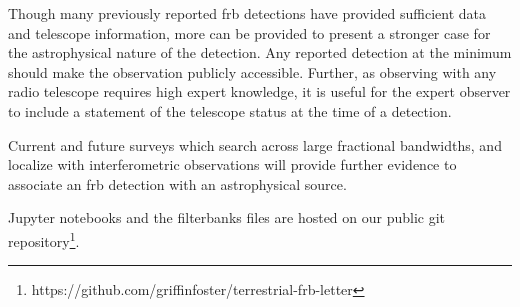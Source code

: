 \documentclass[a4paper,fleqn,usenatbib]{mnras}
\begin{document}
Though many previously reported \gls{frb} detections have provided sufficient
data and telescope information, more can be provided to present a stronger case
for the astrophysical nature of the detection. Any reported detection at the
minimum should make the observation publicly accessible. Further, as
observing with any radio telescope requires high expert knowledge, it is useful
for the expert observer to include a statement of the telescope status at the
time of a detection.

Current and future surveys which search across large fractional bandwidths, and
localize with interferometric observations will provide further evidence to
associate an \gls{frb} detection with an astrophysical source.

Jupyter notebooks and the filterbanks files are hosted on our
public git
repository\footnote{https://github.com/griffinfoster/terrestrial-frb-letter}.


 

\bsp	%
\label{lastpage}
\end{document}
